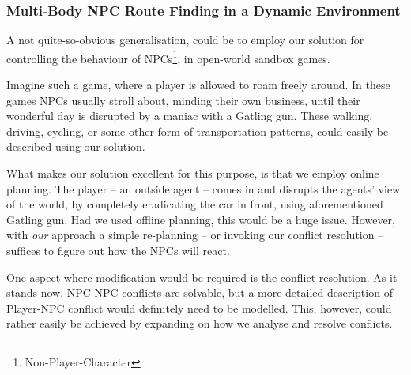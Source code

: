 \documentclass[letterpaper]{article}
\begin{document}

		\subsubsection{Multi-Body NPC Route Finding in a Dynamic Environment}
			A not quite-so-obvious generalisation, could be to employ our solution for controlling the behaviour of NPCs\footnote{Non-Player-Character}, in open-world sandbox games.

			Imagine such a game, where a player is allowed to roam freely around. In these games NPCs usually stroll about, minding their own business, until their wonderful day is disrupted by a maniac with a Gatling gun. These walking, driving, cycling, or some other form of transportation patterns, could easily be described using our solution. 

			What makes our solution excellent for this purpose, is that we employ online planning. The player -- an outside agent -- comes in and disrupts the agents' view of the world, by completely eradicating the car in front, using aforementioned Gatling gun. Had we used offline planning, this would be a huge issue. However, with \emph{our} approach a simple re-planning -- or invoking our conflict resolution -- suffices to figure out how the NPCs will react.

			One aspect where modification would be required is the conflict resolution. As it stands now, NPC-NPC conflicts are solvable, but a more detailed description of Player-NPC conflict would definitely need to be modelled. This, however, could rather easily be achieved by expanding on how we analyse and resolve conflicts.




\end{document}
